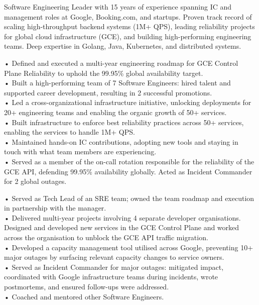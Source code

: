 \documentclass[11pt,a4paper]{moderncv-xetex}
\begin{document}
\setlength{\parskip}{2em}
\maketitle

Software Engineering Leader with 15 years of experience spanning IC and management roles at Google, Booking.com, and startups. Proven track record of scaling high-throughput backend systems (1M+ QPS), leading reliability projects for global cloud infrastructure (GCE), and building high-performing engineering teams. Deep expertise in Golang, Java, Kubernetes, and distributed systems.

{
• Defined and executed a multi-year engineering roadmap for GCE Control Plane Reliability to uphold the 99.95\% global availability target.
\\
• Built a high-performing team of 7 Software Engineers: hired talent and supported career development, resulting in 2 successful promotions.
\\
• Led a cross-organizational infrastructure initiative, unlocking deployments for 20+ engineering teams and enabling the organic growth of 50+ services.
\\
• Built infrastructure to enforce best reliability practices across 50+ services, enabling the services to handle 1M+ QPS.
\\
• Maintained hands-on IC contributions, adopting new tools and staying in touch with what team members are experiencing.
\\
• Served as a member of the on-call rotation responsible for the reliability of the GCE API, defending 99.95\% availability globally. Acted as Incident Commander for 2 global outages.
}

{
• Served as Tech Lead of an SRE team; owned the team roadmap and execution in partnership with the manager.
\\
• Delivered multi-year projects involving 4 separate developer organisations. Designed and developed new services in the GCE Control Plane and worked across the organisation to unblock the GCE API traffic migration.
\\
• Developed a capacity management tool utilised across Google, preventing 10+ major outages by surfacing relevant capacity changes to service owners.
\\
• Served as Incident Commander for major outages: mitigated impact, coordinated with Google infrastructure teams during incidents, wrote postmortems, and ensured follow-ups were addressed.
\\
• Coached and mentored other Software Engineers.
}
\end{document}
